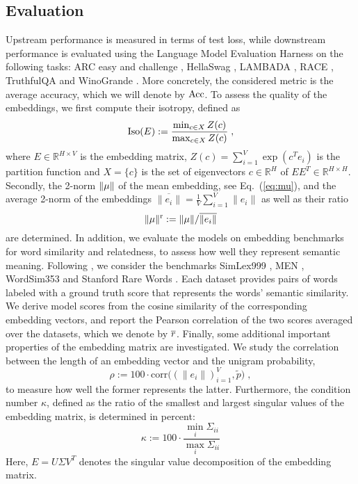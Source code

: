 \subsection{Evaluation}
\label{sec:experiments_evaluation}
Upstream performance is measured in terms of test loss, while downstream performance is evaluated using the Language Model Evaluation Harness \cite{eval-harness} on the following tasks: ARC easy and challenge \cite{clark2018thinksolvedquestionanswering}, HellaSwag \cite{zellers-etal-2019-hellaswag}, LAMBADA \cite{paperno-etal-2016-lambada}, RACE \cite{lai-etal-2017-race}, TruthfulQA \cite{lin-etal-2022-truthfulqa} and WinoGrande \cite{Sakaguchi_LeBras_Bhagavatula_Choi_2020}.
More concretely, the considered metric is the average accuracy, which we will denote by $\rm Acc$.
To assess the quality of the embeddings, we first compute their isotropy, defined as \cite{arora-etal-2016-latent, mu2018allbutthetopsimpleeffectivepostprocessing}
\begin{equation}
{\rm Iso}(E) := \frac{\min_{c \in X} Z(c)}{\max_{c \in X} Z(c)} \; ,
\label{eq:isotropy}
\end{equation}
where $E \in \mathbb{R}^{H \times V}$ is the embedding matrix,
$Z(c) = \sum_{i=1}^V \exp(c^T e_i)$ 
is the partition function and $X = \{ c \}$ is the set of eigenvectors $c \in \mathbb{R}^{H}$ of $E E^T \in \mathbb{R}^{H \times H}$.
Secondly, the 2-norm $\|\mu\|$ of the mean embedding, see Eq.~(\ref{eq:mu}), and the average 2-norm of the embeddings
$\overline{\|e_i\|} = \frac{1}{V} \sum_{i=1}^V \|e_i\|$
as well as their ratio 
\begin{equation}
\|\mu\|^{\rm r} := \|\mu\| / \overline{\|e_i\|}
\end{equation}
are determined. 
In addition, we evaluate the models on embedding benchmarks for word similarity and relatedness, to assess how well they represent semantic meaning. Following \citet{bis2021tmic}, we consider the benchmarks SimLex999 \cite{hill-etal-2015-simlex}, MEN \cite{10.5555/2655713.2655714}, WordSim353 \cite{finkelstein} and Stanford Rare Words \cite{luong-etal-2013-better}. Each dataset provides pairs of words labeled with a ground truth score that represents the words' semantic similarity. 
We derive model scores from the cosine similarity of the corresponding embedding vectors, and report the Pearson correlation of the two scores averaged over the datasets, which we denote by $\overline{r}$.
Finally, some additional important properties of the embedding matrix are investigated.
We study the correlation between the length of an embedding vector and the unigram probability,
\begin{equation}
\rho := 100 \cdot \text{corr} \big( (\|e_i\|)_{i=1}^V, \widetilde p \big) \; ,
\label{eq:rho} %
\end{equation}
to measure how well the former represents the latter.
Furthermore, the condition number $\kappa$, defined as the ratio of the smallest and largest singular values of the embedding matrix, is determined in percent:
\begin{equation}
\kappa := 100 \cdot \frac{\min_i \Sigma_{ii}}{\max_i \Sigma_{ii}}
\label{eq:kappa}
\end{equation}
Here, $E = U \Sigma V^T$ denotes the singular value decomposition of the embedding matrix.
